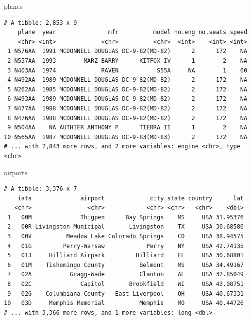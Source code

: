 \documentclass[]{article}
\newenvironment{Shaded}{\begin{snugshade}}{\end{snugshade}}
\newcommand{\NormalTok}[1]{{#1}}
\theoremstyle{definition}
\theoremstyle{definition}
\theoremstyle{definition}
\theoremstyle{remark}
\begin{document}
\begin{Shaded}
\begin{Highlighting}[]
\NormalTok{planes}
\end{Highlighting}
\end{Shaded}

\begin{verbatim}
# A tibble: 2,853 x 9
    plane  year               mfr          model no.eng no.seats speed
    <chr> <int>             <chr>          <chr>  <int>    <int> <int>
 1 N576AA  1991 MCDONNELL DOUGLAS DC-9-82(MD-82)      2      172    NA
 2 N557AA  1993        MARZ BARRY      KITFOX IV      1        2    NA
 3 N403AA  1974             RAVEN           S55A     NA        1    60
 4 N492AA  1989 MCDONNELL DOUGLAS DC-9-82(MD-82)      2      172    NA
 5 N262AA  1985 MCDONNELL DOUGLAS DC-9-82(MD-82)      2      172    NA
 6 N493AA  1989 MCDONNELL DOUGLAS DC-9-82(MD-82)      2      172    NA
 7 N477AA  1988 MCDONNELL DOUGLAS DC-9-82(MD-82)      2      172    NA
 8 N476AA  1988 MCDONNELL DOUGLAS DC-9-82(MD-82)      2      172    NA
 9 N504AA    NA AUTHIER ANTHONY P      TIERRA II      1        2    NA
10 N565AA  1987 MCDONNELL DOUGLAS DC-9-83(MD-83)      2      172    NA
# ... with 2,843 more rows, and 2 more variables: engine <chr>, type <chr>
\end{verbatim}

\begin{Shaded}
\begin{Highlighting}[]
\NormalTok{airports}
\end{Highlighting}
\end{Shaded}

\begin{verbatim}
# A tibble: 3,376 x 7
    iata              airport             city state country      lat
   <chr>                <chr>            <chr> <chr>   <chr>    <dbl>
 1   00M              Thigpen      Bay Springs    MS     USA 31.95376
 2   00R Livingston Municipal       Livingston    TX     USA 30.68586
 3   00V          Meadow Lake Colorado Springs    CO     USA 38.94575
 4   01G         Perry-Warsaw            Perry    NY     USA 42.74135
 5   01J     Hilliard Airpark         Hilliard    FL     USA 30.68801
 6   01M    Tishomingo County          Belmont    MS     USA 34.49167
 7   02A           Gragg-Wade          Clanton    AL     USA 32.85049
 8   02C              Capitol       Brookfield    WI     USA 43.08751
 9   02G    Columbiana County   East Liverpool    OH     USA 40.67331
10   03D     Memphis Memorial          Memphis    MO     USA 40.44726
# ... with 3,366 more rows, and 1 more variables: long <dbl>
\end{verbatim}
\end{document}
